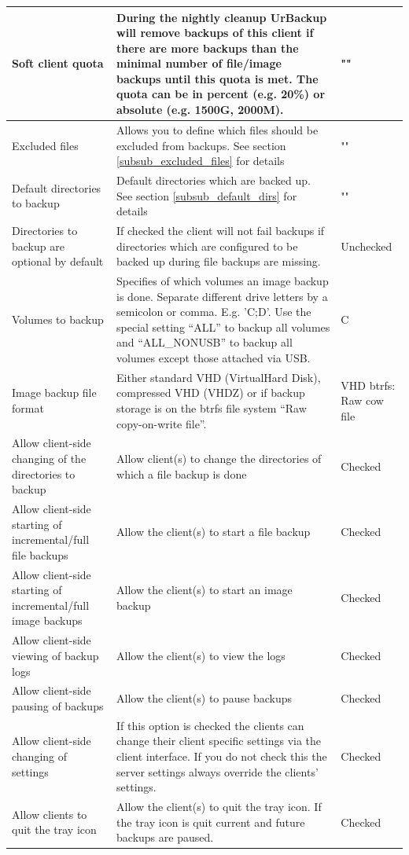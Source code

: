 \documentclass[a4paper,10pt]{article}
\begin{document}
\begin{longtable}{|p{}|p{}|p{}|}
\hline
Soft client quota & During the nightly cleanup UrBackup will remove backups of this client
if there are more backups than the minimal number of file/image backups until this quota is met. The quota can be in percent (e.g. 20\%) or
absolute (e.g. 1500G, 2000M). & "" \\
\hline
Excluded files & Allows you to define which files should be excluded from backups. See section \ref{subsub_excluded_files} for details & "" \\
\hline
Default directories to backup & Default directories which are backed up. See section \ref{subsub_default_dirs} for details & ""\\
\hline
Directories to backup are optional by default & If checked the client will not fail backups if directories which are configured to be backed up during file backups are missing. & Unchecked\\
\hline
Volumes to backup & Specifies of which volumes an image backup is done. Separate different drive letters by a semicolon or comma. E.g. 'C;D'. Use the special setting ``ALL'' to backup all volumes and ``ALL\_NONUSB'' to backup all volumes except those attached via USB. & C \\
\hline
Image backup file format & Either standard VHD (VirtualHard Disk), compressed VHD (VHDZ) or if backup storage is on the btrfs file system ``Raw copy-on-write file''. & VHD btrfs: Raw cow file\\
\hline
Allow client-side changing of the directories to backup & Allow client(s) to change the directories of which a file backup is done & Checked \\
\hline
Allow client-side starting of incremental/full file backups & Allow the client(s) to start a file backup & Checked \\
\hline
Allow client-side starting of incremental/full image backups & Allow the client(s) to start an image backup & Checked \\
\hline
Allow client-side viewing of backup logs & Allow the client(s) to view the logs & Checked \\
\hline
Allow client-side pausing of backups & Allow the client(s) to pause backups & Checked \\
\hline
Allow client-side changing of settings & If this option is checked the clients can change their client specific settings via the client interface. If you do not check this the server settings always override the clients' settings. & Checked\\
\hline
Allow clients to quit the tray icon & Allow the client(s) to quit the tray icon. If the tray icon is quit current and future backups are paused. & Checked \\
\hline
\end{longtable}
\end{document}
